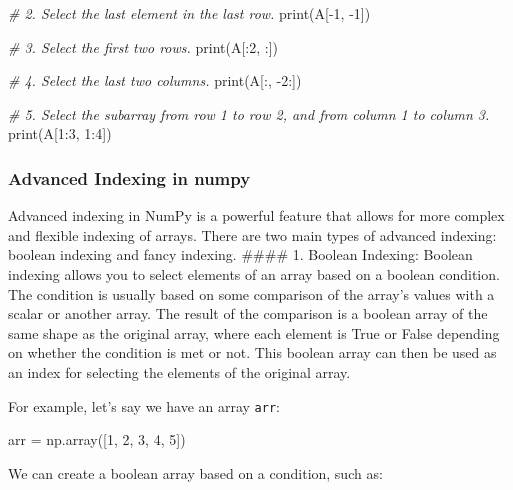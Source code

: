 \documentclass[11pt]{article}
\newenvironment{Shaded}{}{}
\newcommand{\DecValTok}[1]{\textcolor[rgb]{0.25,0.63,0.44}{{#1}}}
\newcommand{\CommentTok}[1]{\textcolor[rgb]{0.38,0.63,0.69}{\textit{{#1}}}}
\newcommand{\NormalTok}[1]{{#1}}
\newcommand{\OperatorTok}[1]{\textcolor[rgb]{0.40,0.40,0.40}{{#1}}}
\newcommand{\BuiltInTok}[1]{{#1}}
\begin{document}
\begin{itemize}
\begin{Shaded}
\begin{Highlighting}[]
\CommentTok{\# 2. Select the last element in the last row.}
\BuiltInTok{print}\NormalTok{(A[}\OperatorTok{{-}}\DecValTok{1}\NormalTok{, }\OperatorTok{{-}}\DecValTok{1}\NormalTok{])}

\CommentTok{\# 3. Select the first two rows.}
\BuiltInTok{print}\NormalTok{(A[:}\DecValTok{2}\NormalTok{, :])}

\CommentTok{\# 4. Select the last two columns.}
\BuiltInTok{print}\NormalTok{(A[:, }\OperatorTok{{-}}\DecValTok{2}\NormalTok{:])}

\CommentTok{\# 5. Select the subarray from row 1 to row 2, and from column 1 to column 3.}
\BuiltInTok{print}\NormalTok{(A[}\DecValTok{1}\NormalTok{:}\DecValTok{3}\NormalTok{, }\DecValTok{1}\NormalTok{:}\DecValTok{4}\NormalTok{])}
\end{Highlighting}
\end{Shaded}

  \hypertarget{advanced-indexing-in-numpy}{%
  \subsubsection{Advanced Indexing in
  numpy}\label{advanced-indexing-in-numpy}}

  Advanced indexing in NumPy is a powerful feature that allows for more
  complex and flexible indexing of arrays. There are two main types of
  advanced indexing: boolean indexing and fancy indexing. \#\#\#\# 1.
  Boolean Indexing: Boolean indexing allows you to select elements of an
  array based on a boolean condition. The condition is usually based on
  some comparison of the array's values with a scalar or another array.
  The result of the comparison is a boolean array of the same shape as
  the original array, where each element is True or False depending on
  whether the condition is met or not. This boolean array can then be
  used as an index for selecting the elements of the original array.

  For example, let's say we have an array \texttt{arr}:

\begin{Shaded}
\begin{Highlighting}[]
\NormalTok{arr }\OperatorTok{=}\NormalTok{ np.array([}\DecValTok{1}\NormalTok{, }\DecValTok{2}\NormalTok{, }\DecValTok{3}\NormalTok{, }\DecValTok{4}\NormalTok{, }\DecValTok{5}\NormalTok{])}
\end{Highlighting}
\end{Shaded}

  We can create a boolean array based on a condition, such as:
\end{itemize}
\end{document}

